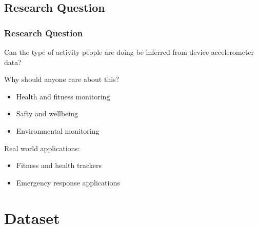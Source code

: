 \documentclass[
	11pt, %
]{beamer}
\begin{document}

\subsection{Research Question}

\begin{frame}
	\frametitle{Research Question}
	
	Can the type of activity people are doing be inferred from device accelerometer data?

    \bigskip
		Why should anyone care about this?

    \begin{itemize}
        \item Health and fitness monitoring
        \item Safty and wellbeing
        \item Environmental monitoring
    \end{itemize}

    \bigskip

    Real world applications:
    \begin{itemize}
        \item Fitness and health trackers
        \item Emergency response applications
    \end{itemize}
\end{frame}


\section{Dataset}
\end{document}
